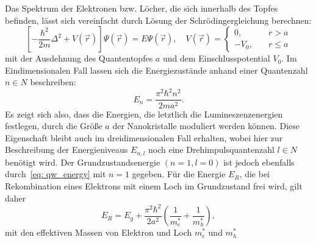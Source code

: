 Das Spektrum der Elektronen bzw. Löcher,
die sich innerhalb des Topfes befinden, lässt sich vereinfacht durch Lösung der Schrödingergleichung berechnen:
\begin{equation}
  \left[-\frac{\hbar^2}{2 m} \Delta^2 + V(\vec{r}) \right] \Psi(\vec{r}) = E \Psi(\vec{r}), \quad
  V(\vec{r}) = \begin{cases}
0,& \quad r > a\\
-V_0,& \quad r \leq a
\end{cases}
\end{equation}
mit der Ausdehnung des Quantentopfes $a$ und dem Einschlusspotential $V_0$.
Im Eindimensionalen Fall lassen sich die Energiezustände
anhand einer Quantenzahl $n \in N$ beschreiben:
\begin{equation}
  E_n = \frac{\pi^2\hbar^2n^2}{ 2 m a^2}.
  \label{eq: qw_energy}
\end{equation}
Es zeigt sich also, dass die Energien, die letztlich die Lumineszenzenergien festlegen, durch die Größe $a$ der Nanokristalle
moduliert werden können. Diese Eigenschaft bleibt auch im dreidimensionalen Fall erhalten, wobei hier zur Beschreibung der
Energieniveaus $E_{n, l}$ noch eine Drehimpulsquantenzahl $l \in N$ benötigt wird. Der Grundzustandsenergie
$(n = 1, l = 0)$ ist jedoch ebenfalls durch~\eqref{eq: qw_energy} mit $n = 1$ gegeben. Für die Energie $E_R$, die bei Rekombination eines
Elektrons mit einem Loch im Grundzustand frei wird, gilt daher
\begin{equation}
  E_R = E_g + \frac{\pi^2\hbar^2}{ 2  a^2} \left(\frac{1}{m_e^*} + \frac{1}{m_h^*}\right),
\end{equation}
mit den effektiven Massen von Elektron und Loch $m_e^*$ und $m_h^*$

